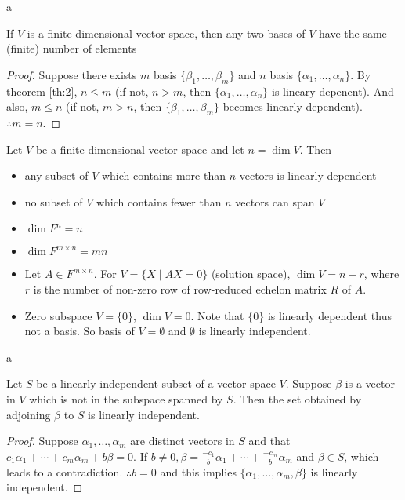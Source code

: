 \documentclass[8pt]{beamer}
\begin{document}
\begin{frame}{a}
    \begin{corollary}
        If $V$ is a finite-dimensional vector space, then any two bases of $V$ have the same (finite) number of elements
    \end{corollary}
    \begin{proof}
            Suppose there exists $m$ basis $\{\beta_1, \dots, \beta_m\}$ and $n$ basis $\{\alpha_1, \dots, \alpha_n\}$. By theorem \ref{th:2}, $n \leq m$ (if not, $n > m$, then $\{\alpha_1, \dots, \alpha_n\}$ is lineary depenent). And also, $m \leq n$ (if not, $m > n$, then $\{\beta_1, \dots, \beta_m\}$ becomes linearly dependent).
            $\therefore m=n$.
    \end{proof}

    \begin{corollary}
        Let $V$ be a finite-dimensional vector space and let $n = \dim{V}$. Then
        \begin{itemize}
            \item any subset of $V$ which contains more than $n$ vectors is linearly dependent
            \item no subset of $V$ which contains fewer than $n$ vectors can span $V$
        \end{itemize}
    \end{corollary}

    \begin{example}
        \begin{itemize}
            \item $\dim{F^n} = n$
            \item $\dim{F^{m \times n}} = mn$
            \item Let $A \in F^{m \times n}$. For $V=\{X\mid AX =0\}$ (solution space), $\dim{V} = n - r$, where $r$ is the number of non-zero row of row-reduced echelon matrix $R$ of $A$.
            \item Zero subspace $V = \{0\}$, $\dim{V} = 0$. Note that $\{0\}$ is linearly dependent thus not a basis. So basis of $V = \emptyset$ and $\emptyset$ is linearly independent.
        \end{itemize}
    \end{example}
\end{frame}

\begin{frame}{a}
    \begin{lemma}
        Let $S$ be a linearly independent subset of a vector space $V$. Suppose $\beta$ is a vector in $V$ which is not in the subspace spanned by $S$. Then the set obtained by adjoining $\beta$ to $S$ is linearly independent.
    \end{lemma}
    \begin{proof}
    Suppose $\alpha_1, \dots, \alpha_m$ are distinct vectors in $S$ and that $c_1\alpha_1 + \cdots + c_m \alpha_m + b \beta = 0$.
    If $b\neq 0, \beta = \frac{-c_1}{b}\alpha_1 + \cdots + \frac{-c_m}{b}\alpha_m$ and $\beta \in S$, which leads to a contradiction. $\therefore b = 0$ and this implies $\{\alpha_1, \dots, \alpha_m, \beta\}$ is linearly independent.
    \end{proof}
\end{frame}
\end{document}
